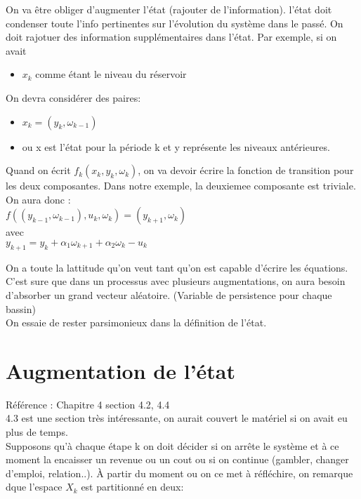 \documentclass[oneside]{book}
\begin{document}
On va être obliger d'augmenter l'état (rajouter de l'information). l'état doit condenser toute l'info pertinentes sur l'évolution du système dans le passé. On doit rajotuer des information supplémentaires dans l'état. Par exemple, si on avait 

\begin{itemize}
\item $x_k$ comme étant le niveau du réservoir
\end{itemize}
On devra considérer des paires:

\begin{itemize}
\item $x_k = (y_k, \omega_{k-1})$
\item ou x est l'état pour la période k et y représente les niveaux antérieures.
\end{itemize}

Quand on écrit $f_k(x_k,y_k,\omega_k)$, on va devoir écrire la fonction de transition pour les deux composantes. Dans notre exemple, la deuxiemee composante est triviale. On aura donc :\\

\center
$f((y_{k-1},\omega_{k-1}), u_k, \omega_k) = (y_{k+1}, \omega_k)$\\

avec\\

$y_{k+1} = y_k + \alpha_1\omega_{k+1} + \alpha_2\omega_k - u_k$

\justify

On a toute la lattitude qu'on veut tant qu'on est capable d'écrire les équations. C'est sure que dans un processus avec plusieurs augmentations, on aura besoin d'absorber un grand vecteur aléatoire. (Variable de persistence pour chaque bassin)\\

On essaie de rester parsimonieux dans la définition de l'état.\\

\section{Augmentation de l'état}
Référence : Chapitre 4 section 4.2, 4.4\\

4.3 est une section très intéressante, on aurait couvert le matériel si on avait eu plus de temps. \\

Supposons qu'à chaque étape k on doit décider si on arrête le système et à ce moment la encaisser un revenue ou un cout ou si on continue (gambler, changer d'emploi, relation..). À partir du moment ou on ce met à réfléchire, on remarque dque l'espace $X_k$ est partitionné en deux:\\
\end{document}
